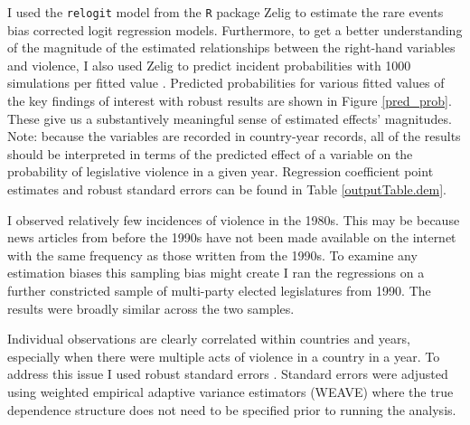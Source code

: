 \documentclass[a4paper]{article}\usepackage{graphicx, color}
\begin{document}
I used the {\tt{relogit}} model from the {\tt{R}} package Zelig \citep{IMAIKingZelig2008} to estimate the rare events bias corrected logit regression models. Furthermore, to get a better understanding of the magnitude of the estimated relationships between the right-hand variables and violence, I also used Zelig to predict incident probabilities with 1000 simulations per fitted value \citep[see][]{King2002}. Predicted probabilities for various fitted values of the key findings of interest with robust results are shown in Figure \ref{pred_prob}. These give us a substantively meaningful sense of estimated effects' magnitudes. Note: because the variables are recorded in country-year records, all of the results should be interpreted in terms of the predicted effect of a variable on the probability of legislative violence in a given year. Regression coefficient point estimates and robust standard errors can be found in Table \ref{outputTable.dem}.

I observed relatively few incidences of violence in the 1980s. This may be because news articles from before the 1990s have not been made available on the internet with the same frequency as those written from the 1990s. To examine any estimation biases this sampling bias might create I ran the regressions on a further constricted sample of multi-party elected legislatures from 1990. The results were broadly similar across the two samples. 

Individual observations are clearly correlated within countries and years, especially when there were multiple acts of violence in a country in a year. To address this issue I used robust standard errors \citep{Golder2006, Mainwaring2007}. Standard errors were adjusted using \cite{Lumley1999} weighted empirical adaptive variance estimators (WEAVE) where the true dependence structure does not need to be specified prior to running the analysis. 
\end{document}

